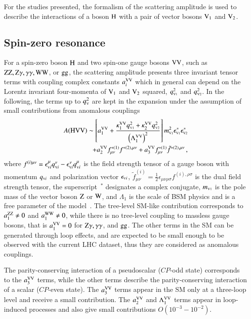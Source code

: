 For the studies presented, the formalism of the scattering amplitude is used
to describe the interactions of a boson $\mathrm{H}$ with a pair of vector bosons $\mathrm{V}_1$ and $\mathrm{V}_2$.

\subsection{Spin-zero resonance}
For a spin-zero boson $\mathrm{H}$ and two spin-one gauge bosons $\mathrm{V}\mathrm{V}$, such
as $\mathrm{Z}\mathrm{Z}, \mathrm{Z} \gamma, \gamma\gamma, \mathrm{W}\mathrm{W}$, or $\mathrm{g}\mathrm{g}$, the scattering amplitude
presents three invariant tensor terms with coupling complex constants $a_{i}^{\mathrm{V}\mathrm{V}}$
which in general can depend on the Lorentz invariant four-momenta
of $\mathrm{V}_1$ and $\mathrm{V}_2$ squared, $q_{\scriptscriptstyle\mathrm{V}1}^2$ and $q_{\scriptscriptstyle\mathrm{V}2}^2$. 
In the following, the terms up to $q_{\scriptscriptstyle\mathrm{V}}^2$  are kept in the expansion under the assumption 
of small contributions from anomalous couplings
%
\begin{eqnarray}
A(\mathrm{H}\mathrm{V}\mathrm{V}) \sim 
\left[ a_{1}^{\mathrm{V}\mathrm{V}} 
+ \frac{\kappa_1^{\mathrm{V}\mathrm{V}}q_{\scriptscriptstyle\mathrm{V}1}^2 + \kappa_2^{\mathrm{V}\mathrm{V}} q_{\scriptscriptstyle\mathrm{V}2}^{2}}{\left(\Lambda_{1}^{\mathrm{V}\mathrm{V}} \right)^{2}} \right] 
m_{\scriptscriptstyle\mathrm{V}1}^2 \epsilon_{\scriptscriptstyle\mathrm{V}1}^* \epsilon_{\scriptscriptstyle\mathrm{V}2}^* \\ \nonumber
+ a_{2}^{\mathrm{V}\mathrm{V}}  f_{\mu \nu}^{*(1)}f^{*(2),\mu\nu} 
+ a_{3}^{\mathrm{V}\mathrm{V}}   f^{*(1)}_{\mu \nu} {\tilde f}^{*(2),\mu\nu}\,,
\label{eq:formfact-fullampl-spin0} 
\end{eqnarray}
%
where $f^{(i){\mu \nu}} =
\epsilon_{{\scriptscriptstyle\mathrm{V}}i}^{\mu}q_{{\scriptscriptstyle\mathrm{V}}i}^{\nu} -
\epsilon_{{\scriptscriptstyle\mathrm{V}}i}^\nu q_{{\scriptscriptstyle\mathrm{V}}i}^{\mu} $ is the field strength
tensor of a gauge boson with momentum $q_{{\scriptscriptstyle\mathrm{V}}i}$ and polarization
vector $\epsilon_{{\scriptscriptstyle\mathrm{V}}i}$, ${\tilde f}^{(i)}_{\mu \nu} =
\frac{1}{2} \epsilon_{\mu\nu\rho\sigma} f^{(i),\rho\sigma}$ is the
dual field strength tensor, the superscript~$^*$ designates a complex
conjugate, $m_{\scriptscriptstyle\mathrm{V}1}$ is the pole mass of the vector boson $\mathrm{Z}$ or
$\mathrm{W}$, and $\Lambda_{1}$ is the scale of BSM physics and is a free
parameter of the model~\cite{Anderson:2013afp}. The tree-level SM-like
contribution corresponds to $a_{1}^{\mathrm{Z}\mathrm{Z}}\ne 0$ and $a_{1}^{\mathrm{W}\mathrm{W}}
\ne 0$, while there is no tree-level coupling to massless gauge
bosons, that is $a_{1}^{\mathrm{V}\mathrm{V}}= 0$ for $\mathrm{Z} \gamma, \gamma\gamma$, and
$\mathrm{g}\mathrm{g}$. The other terms in the SM can be generated through loop
effects, and are expected to be small enough to be observed with the
current LHC dataset, thus they are considered as anomalous couplings.

The parity-conserving interaction of a pseudoscalar ($CP$-odd state)
corresponds to the $a_{3}^{\mathrm{V}\mathrm{V}}$ terms, while the other terms
describe the parity-conserving interaction of a scalar ($CP$-even
state).  The $a_{3}^{\mathrm{V}\mathrm{V}}$ terms appear in the SM only at a
three-loop level and receive a small contribution.  The $a_{2}^{\mathrm{V}\mathrm{V}}$
and $\Lambda_{1}^{\mathrm{V}\mathrm{V}}$ terms appear in loop-induced processes and
also give small contributions $O(10^{-3} - 10^{-2})$.

